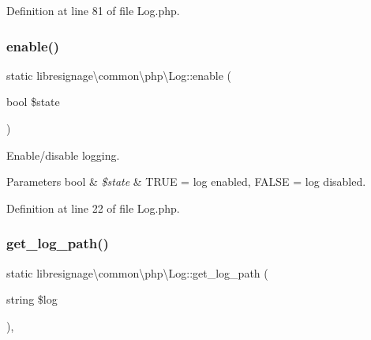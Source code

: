 Definition at line 81 of file Log.\+php.

\mbox{\label{classlibresignage_1_1common_1_1php_1_1Log_ae8b6c43bc9c7894141fc38a86ce3b2b0}} 
\subsubsection{\texorpdfstring{enable()}{enable()}}
{\footnotesize\ttfamily static libresignage\textbackslash{}common\textbackslash{}php\textbackslash{}\+Log\+::enable (\begin{DoxyParamCaption}\item[{bool}]{\$state }\end{DoxyParamCaption})\hspace{0.3cm}{\ttfamily [static]}}

Enable/disable logging.


\begin{DoxyParams}[1]{Parameters}
bool & {\em \$state} & T\+R\+UE = log enabled, F\+A\+L\+SE = log disabled. \\
\hline
\end{DoxyParams}


Definition at line 22 of file Log.\+php.

\mbox{\label{classlibresignage_1_1common_1_1php_1_1Log_a849cd97efe32dd6ded634f582ed81147}} 
\subsubsection{\texorpdfstring{get\+\_\+log\+\_\+path()}{get\_log\_path()}}
{\footnotesize\ttfamily static libresignage\textbackslash{}common\textbackslash{}php\textbackslash{}\+Log\+::get\+\_\+log\+\_\+path (\begin{DoxyParamCaption}\item[{string}]{\$log }\end{DoxyParamCaption})\hspace{0.3cm}{\ttfamily [static]}, {\ttfamily [private]}}

